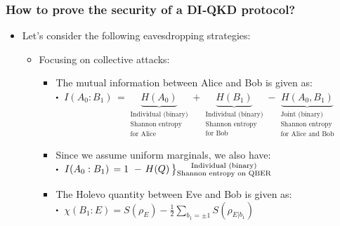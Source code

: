 \documentclass{beamer}
\newcommand\sbullet[1][.5]{\mathbin{\vcenter{\hbox{\scalebox{#1}{$\bullet$}}}}}
\newenvironment{rcases}
  {\left.\begin{aligned}}
  {\end{aligned}\right\rbrace}
\begin{document}
		\begin{frame}
			\frametitle{\large How to prove the security of a DI‑QKD protocol?}

            \vspace{3ex}
            \begin{itemize}
                \item Let's consider the following eavesdropping strategies:
                \begin{itemize}
                    \item Focusing on collective attacks:
                    \begin{itemize}
                        \item The mutual information between Alice and Bob is given as:\\
                        \vspace{0.5ex}
                        $\sbullet$\, $I({A}_{0}:{B}_{1})\, = \underbrace{H({A}_{0})}_{\substack{\text{Individual (binary)}\\ \text{Shannon entropy}\\ \text{for Alice}}} + \underbrace{H({B}_{1})}_{\substack{\text{Individual (binary)}\\ \text{Shannon entropy}\\ \text{for Bob}}} - \underbrace{H({A}_{0},{B}_{1})}_{\substack{\text{Joint (binary)}\\ \text{Shannon entropy}\\ \text{for Alice and Bob}}}$
                        \vspace{0.75ex}
                        \item Since we assume uniform marginals, we also have:\\
                        \vspace{0.5ex}
                        $\sbullet$\, $I({A}_{0}:{B}_{1})\, = 1\ - \begin{rcases}H(Q)\,\end{rcases}\substack{\text{\scriptsize Individual (binary)}\\ \text{Shannon entropy on QBER}}$
                        \vspace{1.5ex}
                        \item The Holevo quantity between Eve and Bob is given as:\\
                        \vspace{0.5ex}
                        $\sbullet$\, $\chi({B}_{1}:E) = S({\rho}_{E}) - \frac{1}{2} \sum_{{b}_{1} = \pm 1} S({\rho}_{E|{b}_{1}})$\\

\end{itemize}
\end{itemize}
\end{itemize}
\end{frame}
\end{document}

